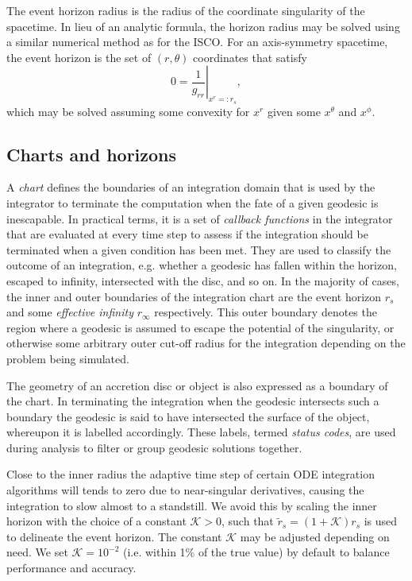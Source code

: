 \documentclass[fleqn,usenatbib]{mnras}
\begin{document}
The event horizon radius is the radius of the coordinate singularity of the
spacetime. In lieu of an analytic formula, the horizon radius may be solved
using a similar numerical method as for the ISCO. For an axis-symmetry
spacetime, the event horizon is the set of $(r, \theta)$ coordinates that
satisfy
\begin{equation}
    \label{eq:event_horizon}
    0 = \left. \frac{1}{g_{rr}} \right\rvert_{x^r =: r_s},
\end{equation}
which may be solved assuming some convexity for $x^r$ given some $x^\theta$ and
$x^\phi$.

\subsection{Charts and horizons}

A \emph{chart} defines the boundaries of an integration domain that is used by
the integrator to terminate the computation when the fate of a given geodesic is
inescapable. In practical terms, it is a set of \emph{callback functions} in the
integrator that are evaluated at every time step to assess if the integration
should be terminated when a given condition has been met. They are used to
classify the outcome of an integration, e.g. whether a geodesic has fallen within the
horizon, escaped to infinity, intersected with the disc, and so on. In the
majority of cases, the inner and outer boundaries of the integration chart are
the event horizon $r_s$ and some \emph{effective infinity} $r_\infty$
respectively. This outer boundary denotes the region where a geodesic is assumed
to escape the potential of the singularity, or otherwise some arbitrary
outer cut-off radius for the integration depending on the problem being
simulated.

The geometry of an accretion disc or object is also expressed as a boundary of
the chart. In terminating the integration when the geodesic intersects such a
boundary the geodesic is said to have intersected the surface of the object,
whereupon it is labelled accordingly. These labels, termed \emph{status codes},
are used during analysis to filter or group geodesic solutions together.

Close to the inner radius the adaptive time step of certain ODE integration
algorithms will tends to zero due to near-singular derivatives, causing the
integration to slow almost to a standstill. We avoid this by scaling the inner
horizon with the choice of a constant $\mathcal{K} > 0$, such that $\tilde{r}_s
= (1 + \mathcal{K}) r_s$ is used to delineate the event horizon.  The constant
$\mathcal{K}$ may be adjusted depending on need. We set $\mathcal{K} = 10^{-2}$
(i.e. within 1\% of the true value) by default to balance performance and
accuracy.
\end{document}

